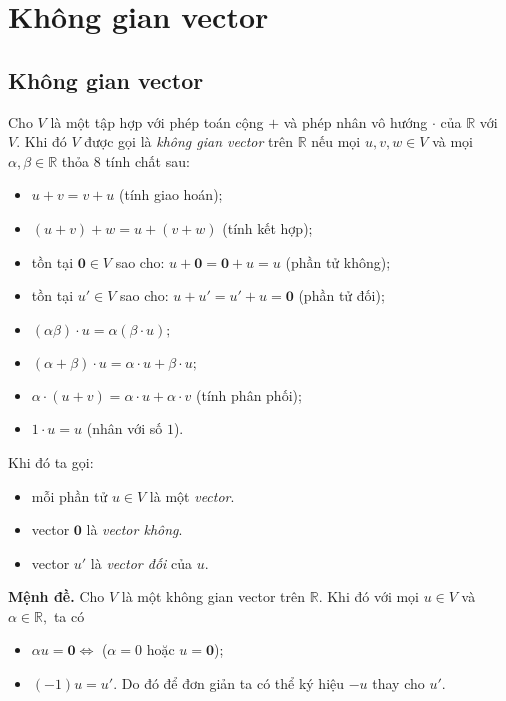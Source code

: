 \chapter{Không gian vector}
\section{Không gian vector}
Cho $V$ là một tập hợp với phép toán cộng $\mathbf{+}$ và phép nhân vô hướng $\mathbf{\cdot}$ của $\mathbb{R}$ với $V.$ Khi đó $V$ được gọi là \textit{không gian vector} trên $\mathbb{R}$ nếu mọi $u, v, w \in V$ và mọi $\alpha, \beta \in \mathbb{R}$ thỏa 8 tính chất sau:
\begin{itemize}
\item $u + v = v + u$ (tính giao hoán);
\item $\left( {u + v} \right) + w = u + \left( {v + w} \right)$ (tính kết hợp);
\item tồn tại $\mathbf{0} \in V$ sao cho: $u + \mathbf{0} = \mathbf{0} + u = u$ (phần tử không);
\item tồn tại $u' \in V$ sao cho: $u + u' = u' + u = \mathbf{0}$ (phần tử đối);
\item $\left( {\alpha \beta } \right) \cdot u = \alpha \left( {\beta  \cdot u} \right);$
\item $\left( {\alpha  + \beta } \right) \cdot u = \alpha  \cdot u + \beta  \cdot u;$
\item $\alpha  \cdot \left( {u + v} \right) = \alpha  \cdot u + \alpha  \cdot v$ (tính phân phối);
\item $1 \cdot u = u$ (nhân với số $1$).
\end{itemize}
Khi đó ta gọi:
\begin{itemize}
\item mỗi phần tử $u \in V$ là một \textit{vector}.
\item vector $\mathbf{0}$ là \textit{vector không}.
\item vector $u'$ là \textit{vector đối} của $u.$
\end{itemize}
\begin{mybox}
\textbf{Mệnh đề.} Cho $V$ là một không gian vector trên $\mathbb{R}.$ Khi đó với mọi $u \in V$ và $\alpha \in \mathbb{R},$ ta có
\begin{itemize}
\item $\alpha u = \mathbf{0} \Leftrightarrow$ ($\alpha = 0$ hoặc $u = \mathbf{0}$);
\item $\left( {-1} \right)u = u'.$ Do đó để đơn giản ta có thể ký hiệu $-u$ thay cho $u'.$
\end{itemize}
\end{mybox}
